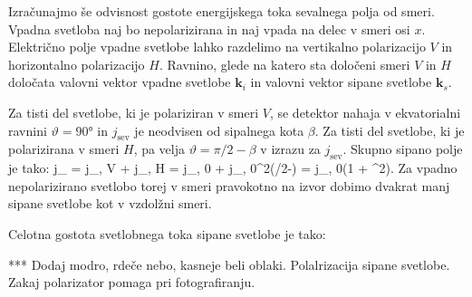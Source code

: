 Izračunajmo še odvisnost gostote energijskega toka sevalnega polja od smeri. Vpadna svetloba naj bo 
nepolarizirana in naj vpada na delec v smeri osi $x$. Električno polje vpadne svetlobe lahko razdelimo
na vertikalno polarizacijo $V$ in horizontalno polarizacijo $H$. Ravnino, glede na katero sta določeni 
smeri $V$ in $H$ določata valovni vektor vpadne svetlobe $\mathbf{k}_i$ in valovni vektor sipane svetlobe
$\mathbf{k}_s$. 

Za tisti del svetlobe, ki je polariziran v smeri $V$, se detektor nahaja v ekvatorialni ravnini 
$\vartheta = 90\si{\degree}$ in $j_\mathrm{sev}$ je neodvisen od sipalnega kota $\beta$. Za tisti del 
svetlobe, ki je polarizirana v smeri $H$, pa velja $\vartheta = \pi/2-\beta$ v izrazu za $j_\mathrm{sev}$.
Skupno sipano polje je tako:
\beq
j_ = j_{, V} + j_{, H} = j_{, 0} + 
j_{, 0}\sin^2\left(\pi/2-\beta \right) = j_{, 0}\left(1 + \cos^2\beta\right).
\label{eq:07_13}
\eeq
Za vpadno nepolarizirano svetlobo torej v smeri pravokotno na izvor dobimo dvakrat manj sipane svetlobe
kot v vzdolžni smeri. 

Celotna gostota svetlobnega toka sipane svetlobe je tako:

*** Dodaj modro, rdeče nebo, kasneje beli oblaki. Polalrizacija sipane svetlobe.
Zakaj polarizator pomaga pri fotografiranju.

